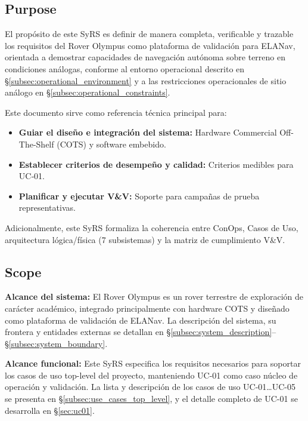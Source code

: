 \subsection{Purpose}

El propósito de este SyRS es definir de manera completa, verificable y trazable los requisitos del Rover Olympus como plataforma de validación para ELANav, orientada a demostrar capacidades de navegación autónoma sobre terreno en condiciones análogas, conforme al entorno operacional descrito en §\ref{subsec:operational_environment} y a las restricciones operacionales de sitio análogo en §\ref{subsec:operational_constraints}. \cite{ieee_29148}

Este documento sirve como referencia técnica principal para:
\begin{itemize}
    \item \textbf{Guiar el diseño e integración del sistema:} Hardware Commercial Off-The-Shelf (COTS) y software embebido.
    \item \textbf{Establecer criterios de desempeño y calidad:} Criterios medibles para UC‑01.
    \item \textbf{Planificar y ejecutar V\&V:} Soporte para campañas de prueba representativas. \cite{nasa_se_handbook, ieee_29148}
\end{itemize}

Adicionalmente, este SyRS formaliza la coherencia entre ConOps, Casos de Uso, arquitectura lógica/física (7 subsistemas) y la matriz de cumplimiento V\&V. \cite{nasa_se_handbook}

\subsection{Scope}

\textbf{Alcance del sistema:} El Rover Olympus es un rover terrestre de exploración de carácter académico, integrado principalmente con hardware COTS y diseñado como plataforma de validación de ELANav. La descripción del sistema, su frontera y entidades externas se detallan en §\ref{subsec:system_description}–§\ref{subsec:system_boundary}. \cite{ieee_29148}

\textbf{Alcance funcional:} Este SyRS especifica los requisitos necesarios para soportar los casos de uso top-level del proyecto, manteniendo UC-01 como caso núcleo de operación y validación. La lista y descripción de los casos de uso UC-01…UC-05 se presenta en §\ref{subsec:use_cases_top_level}, y el detalle completo de UC-01 se desarrolla en §\ref{sec:uc01}. \cite{nasa_se_handbook}

